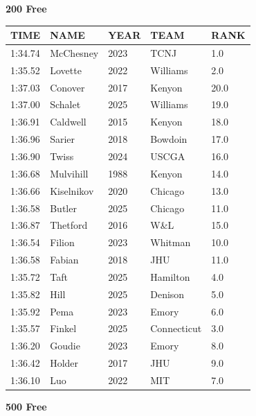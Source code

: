 \begin{table}[H]
\centering
\begin{minipage}[t]{0.48\textwidth}
\centering
\textbf{200 Free}\\[0.1cm]
\begin{tabular}{@{}p{1.8cm}p{2.8cm}p{1.2cm}p{1.4cm}p{0.8cm}@{}}
\hline
    \textbf{TIME} & \textbf{NAME} & \textbf{YEAR} & \textbf{TEAM} & \textbf{RANK} \\
\hline
    1:34.74 & McChesney & 2023 & TCNJ & 1.0 \\
    1:35.52 & Lovette & 2022 & Williams & 2.0 \\
    1:37.03 & Conover & 2017 & Kenyon & 20.0 \\
    1:37.00 & Schalet & 2025 & Williams & 19.0 \\
    1:36.91 & Caldwell & 2015 & Kenyon & 18.0 \\
    1:36.96 & Sarier & 2018 & Bowdoin & 17.0 \\
    1:36.90 & Twiss & 2024 & USCGA & 16.0 \\
    1:36.68 & Mulvihill & 1988 & Kenyon & 14.0 \\
    1:36.66 & Kiselnikov & 2020 & Chicago & 13.0 \\
    1:36.58 & Butler & 2025 & Chicago & 11.0 \\
    1:36.87 & Thetford & 2016 & W\&L & 15.0 \\
    1:36.54 & Filion & 2023 & Whitman & 10.0 \\
    1:36.58 & Fabian & 2018 & JHU & 11.0 \\
    1:35.72 & Taft & 2025 & Hamilton & 4.0 \\
    1:35.82 & Hill & 2025 & Denison & 5.0 \\
    1:35.92 & Pema & 2023 & Emory & 6.0 \\
    1:35.57 & Finkel & 2025 & Connecticut & 3.0 \\
    1:36.20 & Goudie & 2023 & Emory & 8.0 \\
    1:36.42 & Holder & 2017 & JHU & 9.0 \\
    1:36.10 & Luo & 2022 & MIT & 7.0 \\
\hline
\end{tabular}
\end{minipage}\hfill
\begin{minipage}[t]{0.48\textwidth}
\centering
\textbf{500 Free}\\[0.1cm]
\begin{tabular}{@{}p{1.8cm}p{2.8cm}p{1.2cm}p{1.4cm}p{0.8cm}@{}}

\end{tabular}
\end{minipage}
\end{table}
